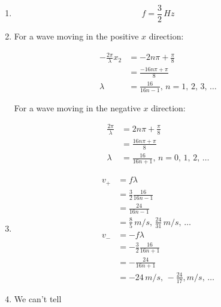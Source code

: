 \documentclass{article}
\begin{document}
\begin{enumerate}
  \item \[f = \frac{3}{2} \,\unit{Hz}\]

  \item

        For a wave moving in the positive $x$ direction:

        \begin{align*}
          -\frac{2 \pi}{\lambda} x_2 & = -2 n \pi + \frac{\pi}{8}                         \\
                                     & = \frac{-16 n \pi + \pi}{8}                        \\
          \lambda                    & = \frac{16}{16 n - 1}, \,n = 1, \,2, \,3, \,\ldots
        \end{align*}

        For a wave moving in the negative $x$ direction:

        \begin{align*}
          \frac{2 \pi}{\lambda} & = 2 n \pi + \frac{\pi}{8}                          \\
                                & = \frac{16 n \pi + \pi}{8}                         \\
          \lambda               & = \frac{16}{16 n + 1}, \,n = 0, \,1, \,2, \,\ldots
        \end{align*}

  \item

        \begin{align*}
          v_+ & = f \lambda                                                        \\
              & = \frac{3}{2} \frac{16}{16 n - 1}                                  \\
              & = \frac{24}{16 n - 1}                                              \\
              & = \frac{8}{5} \,\unit{m/s}, \,\frac{24}{31} \,\unit{m/s}, \,\ldots \\
          v_- & = -f \lambda                                                       \\
              & = -\frac{3}{2} \frac{16}{16 n + 1}                                 \\
              & = -\frac{24}{16 n + 1}                                             \\
              & = -24 \,\unit{m/s}, \,-\frac{24}{17}, \unit{m/s}, \,\ldots
        \end{align*}

  \item We can't tell
\end{enumerate}
\end{document}
